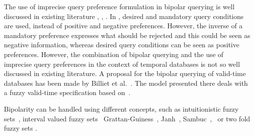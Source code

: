 The use of imprecise query preference formulation in bipolar querying is well discussed in existing literature \cite{DeTre2009}, \cite{Dubois2008}, \cite{Lacroix87}. In \cite{Lacroix87}, desired and mandatory query conditions are used, instead of positive and negative preferences. However, the inverse of a mandatory preference expresses what should be rejected and this could be seen as negative information, whereas desired query conditions can be seen as positive preferences. However, the combination of bipolar querying and the use of imprecise query preferences in the context of temporal databases is not so well discussed in existing literature. A proposal for the bipolar querying of valid-time databases has been made by Billiet et al.~\cite{Billiet:Pons:Matthe:DeTre:Pons:2011:BipolarFuzzy}. The model presented there deals with a fuzzy valid-time specification based on~\cite{garrido2009}.




Bipolarity can be handled using different concepts, such as intuitionistic fuzzy sets~\cite{Atanassov1986}, interval valued fuzzy sets~\cite{Zadeh75a} Grattan-Guiness~\cite{Grattan76}, Janh~\cite{Jahn75}, Sambuc~\cite{Sambuc75},~\cite{Dubois05} or two fold fuzzy sets \cite{Dubois02}.



